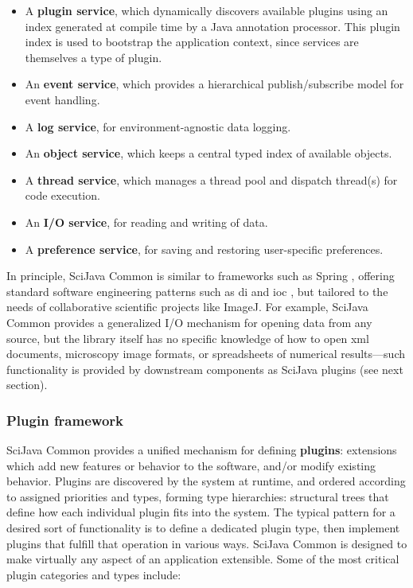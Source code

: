 \documentclass{bmcart}
\begin{document}
\begin{itemize}
  \item A \textbf{plugin service}, which dynamically discovers available
    plugins using an index generated at compile time by a Java annotation
    processor. This plugin index is used to bootstrap the application context,
    since services are themselves a type of plugin.
  \item An \textbf{event service}, which provides a hierarchical
    publish/subscribe model for event handling.
  \item A \textbf{log service}, for environment-agnostic data logging.
  \item An \textbf{object service}, which keeps a central typed index of
    available objects.
  \item A \textbf{thread service}, which manages a thread pool and dispatch
    thread(s) for code execution.
  \item An \textbf{I/O service}, for reading and writing of data.
  \item A \textbf{preference service}, for saving and restoring user-specific
    preferences.
\end{itemize}

In principle, SciJava Common is similar to frameworks such as Spring
\cite{spring}, offering standard software engineering patterns such as
\acrfull{di} \cite{dependency_injection} and \acrfull{ioc} \cite{ioc}, but
tailored to the needs of collaborative scientific projects like ImageJ. For
example, SciJava Common provides a generalized I/O mechanism for opening data
from any source, but the library itself has no specific knowledge of how to
open \acrshort{xml} documents, microscopy image formats, or spreadsheets of
numerical results---such functionality is provided by downstream components as
SciJava plugins (see next section).

\subsubsection*{Plugin framework}
SciJava Common provides a unified mechanism for defining \textbf{plugins}:
extensions which add new features or behavior to the software, and/or modify
existing behavior. Plugins are discovered by the system at runtime, and ordered
according to assigned priorities and types, forming type hierarchies:
structural trees that define how each individual plugin fits into the system.
The typical pattern for a desired sort of functionality is to define a
dedicated plugin type, then implement plugins that fulfill that operation in
various ways. SciJava Common is designed to make virtually any aspect of an
application extensible. Some of the most critical plugin categories and types
include:
\end{document}
